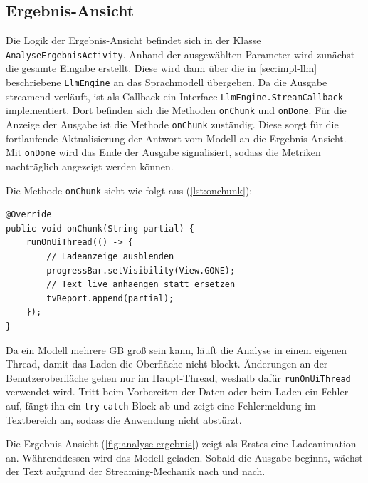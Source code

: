 \subsection{Ergebnis-Ansicht}
Die Logik der Ergebnis-Ansicht befindet sich in der Klasse \texttt{AnalyseErgebnis\-Activity}. Anhand der ausgewählten Parameter wird zunächst die gesamte Eingabe erstellt. Diese wird dann über die in \autoref{sec:impl-llm} beschriebene \texttt{LlmEngine} an das Sprachmodell übergeben. Da die Ausgabe streamend verläuft, ist als Callback ein Interface \texttt{LlmEngine.\allowbreak StreamCallback} implementiert. Dort befinden sich die Methoden \texttt{onChunk} und \texttt{onDone}. Für die Anzeige der Ausgabe ist die Methode \texttt{onChunk} zuständig. Diese sorgt für die fortlaufende Aktualisierung der Antwort vom Modell an die Ergebnis-Ansicht. Mit \texttt{onDone} wird das Ende der Ausgabe signalisiert, sodass die Metriken nachträglich angezeigt werden können.
\vspace{\baselineskip}

\noindent Die Methode \texttt{onChunk} sieht wie folgt aus (\autoref{lst:onchunk}):
\begin{lstlisting}[style=code, caption={[Live-Anzeige der Ausgabe]Live-Anzeige der streamenden Ausgabe. Jedes Teilstück wird angehängt statt gesetzt, damit der Text während der Erzeugung wächst.}, label={lst:onchunk}]
@Override
public void onChunk(String partial) {
    runOnUiThread(() -> {
        // Ladeanzeige ausblenden
        progressBar.setVisibility(View.GONE);
        // Text live anhaengen statt ersetzen
        tvReport.append(partial);
    });
}
\end{lstlisting}

\noindent Da ein Modell mehrere GB groß sein kann, läuft die Analyse in einem eigenen Thread, damit das Laden die Oberfläche nicht blockt. Änderungen an der Benutzeroberfläche gehen nur im Haupt-Thread, weshalb dafür \texttt{runOnUiThread} verwendet wird. Tritt beim Vorbereiten der Daten oder beim Laden ein Fehler auf, fängt ihn ein \texttt{try}-\texttt{catch}-Block ab und zeigt eine Fehlermeldung im Textbereich an, sodass die Anwendung nicht abstürzt.
\vspace{\baselineskip}

\noindent Die Ergebnis-Ansicht (\autoref{fig:analyse-ergebnis}) zeigt als Erstes eine Ladeanimation an. Währenddessen wird das Modell geladen. Sobald die Ausgabe beginnt, wächst der Text aufgrund der Streaming-Mechanik nach und nach.

